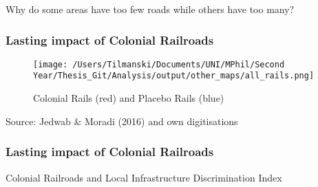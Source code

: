 \documentclass[]{beamer}   	%
\begin{document}
\begin{frame}
Why do some areas have too few roads while others have too many?
\end{frame}

\begin{frame}
\frametitle{Lasting impact of Colonial Railroads}
\begin{figure}
\centering
\texttt{[image: /Users/Tilmanski/Documents/UNI/MPhil/Second Year/Thesis\_Git/Analysis/output/other\_maps/all\_rails.png]}
\caption{Colonial Rails (red) and Placebo Rails (blue)}
\label{fig:Rail Maps}
\end{figure}
  \tiny Source: Jedwab \& Moradi (2016) and own digitisations
\end{frame}

\begin{frame}
\frametitle{Lasting impact of Colonial Railroads}
\begin{table}[t] \centering
  \caption{Colonial Railroads and Local Infrastructure Discrimination Index}
  \label{tab:RailKM_zeta}
  \resizebox{\textwidth}{!}{

}
\end{table}
\end{frame}
\end{document}
